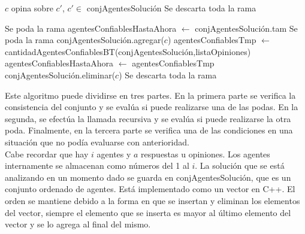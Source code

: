 \documentclass{article}
\begin{document}
\begin{algorithm}
\begin{algorithmic}[1]
 
	 
		 
			\State $c$ opina sobre $c'$, $c' \in$ conjAgentesSolución				\EndIf
		 
			\State Se descarta toda la rama
		\EndIf

			 
				 				
					 
						\State Se poda la rama 			
					\EndIf
				\EndIf
			\EndIf
	\EndFor
\EndFor
\State agentesConfiablesHastaAhora $\gets$ conjAgentesSolución.tam 
 
		\State Se poda la rama 
	\EndIf
	\State conjAgentesSolución.agregar($c$) 
	\State agentesConfiablesTmp $\gets$ cantidadAgentesConfiablesBT(conjAgentesSolución,listaOpiniones)
	 
		\State agentesConfiablesHastaAhora $\gets$ agentesConfiablesTmp 
	\EndIf
	\State conjAgentesSolución.eliminar($c$) 
\EndFor
{} 
	 
		\State Se descarta toda la rama
	\EndIf
\EndIf
\EndFunction
\end{algorithmic}
\end{algorithm}


Este algoritmo puede dividirse en tres partes. En la primera parte se verifica la consistencia del conjunto y se evalúa si puede realizarse una de las podas. En la segunda, se efectúa la llamada recursiva y se evalúa si puede realizarse la otra poda. Finalmente, en la tercera parte se verifica una de las condiciones en una situación que no podía evaluarse con anterioridad. \\
Cabe recordar que hay $i$ agentes y $a$ respuestas u opiniones. Los agentes internamente se almacenan como números del 1 al $i$. La solución que se está analizando en un momento dado se guarda en conjAgentesSolución, que es un conjunto ordenado de agentes. Está implementado como un vector en C++. El orden se mantiene debido a la forma en que se insertan y eliminan los elementos del vector, siempre el elemento que se inserta es mayor al último elemento del vector y se lo agrega al final del mismo.
\end{document}
